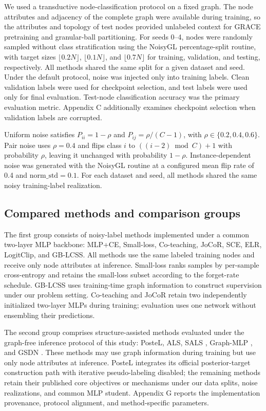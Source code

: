 \documentclass[10pt,letterpaper]{elsarticle}
\begin{document}
We used a transductive node-classification protocol on a fixed graph. The node attributes and adjacency of the complete graph were available during training, so the attributes and topology of test nodes provided unlabeled context for GRACE pretraining and granular-ball partitioning. For seeds 0--4, nodes were randomly sampled without class stratification using the NoisyGL percentage-split routine, with target sizes \(\lfloor 0.2N\rfloor\), \(\lfloor 0.1N\rfloor\), and \(\lfloor 0.7N\rfloor\) for training, validation, and testing, respectively. All methods shared the same split for a given dataset and seed. Under the default protocol, noise was injected only into training labels. Clean validation labels were used for checkpoint selection, and test labels were used only for final evaluation. Test-node classification accuracy was the primary evaluation metric. Appendix C additionally examines checkpoint selection when validation labels are corrupted.

Uniform noise satisfies \(P_{ii} = 1 - \rho\) and \(P_{ij} = \rho/(C - 1)\), with \(\rho \in \{ 0.2,0.4,0.6\}\). Pair noise uses \(\rho = 0.4\) and flips class \(i\) to \(((i - 2)\bmod C) + 1\) with probability \(\rho\), leaving it unchanged with probability \(1 - \rho\). Instance-dependent noise was generated with the NoisyGL routine at a configured mean flip rate of 0.4 and \(\text{norm\_std} = 0.1\). For each dataset and seed, all methods shared the same noisy training-label realization.

\subsection{Compared methods and comparison groups}\label{sec:4.3}

The first group consists of noisy-label methods implemented under a common two-layer MLP backbone: MLP+CE, Small-loss, Co-teaching, JoCoR, SCE, ELR, LogitClip, and GB-LCSS. All methods use the same labeled training nodes and receive only node attributes at inference. Small-loss ranks samples by per-sample cross-entropy and retains the small-loss subset according to the forget-rate schedule. GB-LCSS uses training-time graph information to construct supervision under our problem setting. Co-teaching and JoCoR retain two independently initialized two-layer MLPs during training; evaluation uses one network without ensembling their predictions.

The second group comprises structure-assisted methods evaluated under the graph-free inference protocol of this study: PosteL, ALS, SALS \cite{ref60,ref61,ref62}, Graph-MLP \cite{ref4}, and GSDN \cite{ref14}. These methods may use graph information during training but use only node attributes at inference. PosteL integrates its official posterior-target construction path with iterative pseudo-labeling disabled; the remaining methods retain their published core objectives or mechanisms under our data splits, noise realizations, and common MLP student. Appendix G reports the implementation provenance, protocol alignment, and method-specific parameters.
\end{document}
